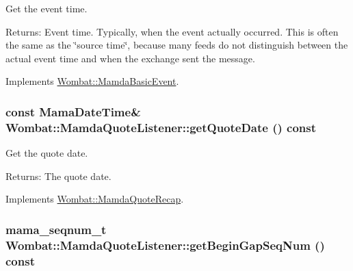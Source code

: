Get the event time. 

\begin{Desc}
\item[Returns:]Event time. Typically, when the event actually occurred. This is often the same as the \char`\"{}source time\char`\"{}, because many feeds do not distinguish between the actual event time and when the exchange sent the message. \end{Desc}


Implements \hyperlink{classWombat_1_1MamdaBasicEvent_7285491c2c657207a64b1b0449c0339b}{Wombat::Mamda\-Basic\-Event}.\hypertarget{classWombat_1_1MamdaQuoteListener_b7fa56da5969989fe36247d8e8d32f3f}{
\subsubsection[getQuoteDate]{\setlength{\rightskip}{0pt plus 5cm}const Mama\-Date\-Time\& Wombat::Mamda\-Quote\-Listener::get\-Quote\-Date () const}}
\label{classWombat_1_1MamdaQuoteListener_b7fa56da5969989fe36247d8e8d32f3f}


Get the quote date. 

\begin{Desc}
\item[Returns:]The quote date. \end{Desc}


Implements \hyperlink{classWombat_1_1MamdaQuoteRecap_1400aa5f7ac60907d95f07fb3fd2192b}{Wombat::Mamda\-Quote\-Recap}.\hypertarget{classWombat_1_1MamdaQuoteListener_d54593507488bdf2f07f532c4eb00549}{
\subsubsection[getBeginGapSeqNum]{\setlength{\rightskip}{0pt plus 5cm}mama\_\-seqnum\_\-t Wombat::Mamda\-Quote\-Listener::get\-Begin\-Gap\-Seq\-Num () const}}
\label{classWombat_1_1MamdaQuoteListener_d54593507488bdf2f07f532c4eb00549}


